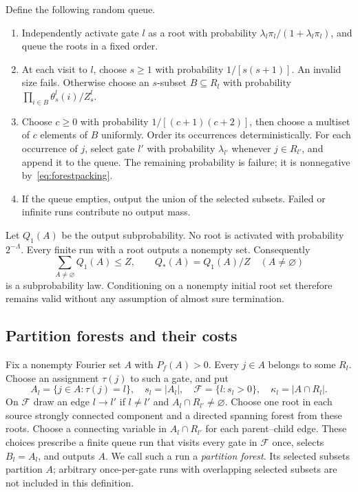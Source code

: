 Define the following random queue.
\begin{enumerate}[label=(\roman*)]
\item Independently activate gate $l$ as a root with probability $\lambda_l\pi_l/(1+\lambda_l\pi_l)$, and queue the roots in a fixed order.
\item At each visit to $l$, choose $s\ge1$ with probability $1/[s(s+1)]$. An invalid size fails. Otherwise choose an $s$-subset $B\subseteq R_l$ with probability $\prod_{i\in B}\theta_s^l(i)/Z_s^l$.
\item Choose $c\ge0$ with probability $1/[(c+1)(c+2)]$, then choose a multiset of $c$ elements of $B$ uniformly. Order its occurrences deterministically. For each occurrence of $j$, select gate $l'$ with probability $\lambda_{l'}$ whenever $j\in R_{l'}$, and append it to the queue. The remaining probability is failure; it is nonnegative by~\eqref{eq:forestpacking}.
\item If the queue empties, output the union of the selected subsets. Failed or infinite runs contribute no output mass.
\end{enumerate}
Let $Q_1(A)$ be the output subprobability. No root is activated with probability $2^{-\Lambda}$. Every finite run with a root outputs a nonempty set. Consequently
\begin{equation}\label{eq:forestconditioning}
 \sum_{A\ne\varnothing}Q_1(A)\le Z,
 \qquad Q_*(A)=Q_1(A)/Z\quad(A\ne\varnothing)
\end{equation}
is a subprobability law. Conditioning on a nonempty initial root set therefore remains valid without any assumption of almost sure termination.

\subsection{Partition forests and their costs}

Fix a nonempty Fourier set $A$ with $P_f(A)>0$. Every $j\in A$ belongs to some $R_l$. Choose an assignment $\tau(j)$ to such a gate, and put
\[
 A_l=\{j\in A:\tau(j)=l\},\quad s_l=|A_l|,
 \quad\mathcal F=\{l:s_l>0\},\quad\kappa_l=|A\cap R_l|.
\]
On $\mathcal F$ draw an edge $l\to l'$ if $l\ne l'$ and $A_l\cap R_{l'}\ne\varnothing$. Choose one root in each source strongly connected component and a directed spanning forest from these roots. Choose a connecting variable in $A_l\cap R_{l'}$ for each parent--child edge. These choices prescribe a finite queue run that visits every gate in $\mathcal F$ once, selects $B_l=A_l$, and outputs $A$. We call such a run a \emph{partition forest}. Its selected subsets partition $A$; arbitrary once-per-gate runs with overlapping selected subsets are not included in this definition.

